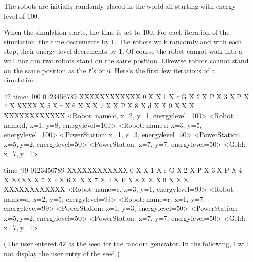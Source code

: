 The robots are initially randomly placed in the world all starting
with energy level of 100.

When the simulation starts, the time is set to 100.
For each iteration of the simulation, the time decrements by 1.
The robots walk randomly and with each step, their energy level decrements by
1.
Of course the robot cannot walk into a wall nor can two robots stand
on the same position.
Likewise robots cannot stand on the same position as the \verb!P!'s or
\verb!G!.
Here's the first few iterations of a simulation:
{\small
\begin{console}[commandchars=\\\{\}]
\underline{42}
time: 100
   0123456789
  XXXXXXXXXXXX
0 X          X
1 X  c    G  X
2 X     P    X
3 X P        X
4 X   XXXX   X
5 X   r      X
6 X   X      X
7 X   X   P  X
8 X d X      X
9 X   X      X
  XXXXXXXXXXXX
<Robot: name:c, x=2, y=1, energylevel=100>
<Robot: name:d, x=1, y=8, energylevel=100>
<Robot: name:r: x=3, y=5, energylevel=100>
<PowerStation: x=1, y=3, energylevel=50>
<PowerStation: x=5, y=2, energylevel=50>
<PowerStation: x=7, y=7, energylevel=50>
<Gold: x=7, y=1>

time: 99
   0123456789
  XXXXXXXXXXXX
0 X          X
1 X   c   G  X
2 X     P    X
3 X P        X
4 X   XXXX   X
5 X  r       X
6 X   X      X
7 X d X   P  X
8 X   X      X
9 X   X      X
  XXXXXXXXXXXX
<Robot: name=c, x=3, y=1, energylevel=99>
<Robot: name=d, x=2, y=5, energylevel=99>
<Robot: name=r, x=1, y=7, energylevel=99>
<PowerStation: x=1, y=3, energylevel=50>
<PowerStation: x=5, y=2, energylevel=50>
<PowerStation: x=7, y=7, energylevel=50>
<Gold: x=7, y=1>
\end{console}
}
(The user entered \verb!42! as the seed for the random generator.
In the following, I will not display the user entry of the seed.)


